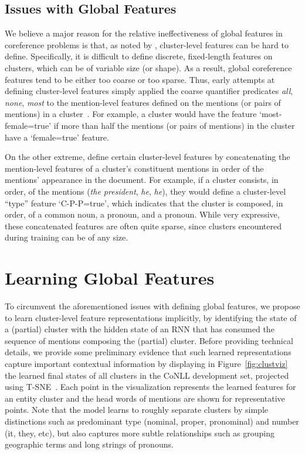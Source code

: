 \documentclass[11pt,letterpaper]{article}
\begin{document}
\subsection{Issues with Global Features}
We believe a major reason for the relative ineffectiveness of global features in coreference problems is that, as noted by , cluster-level features can be hard to define.  Specifically, it is difficult to define discrete, fixed-length features on clusters, which can be of variable size (or shape). As a result, global coreference features tend to be either too coarse or too sparse. Thus, early attempts at defining cluster-level features simply applied the coarse quantifier predicates \textit{all}, \textit{none}, \textit{most} to the mention-level features defined on the mentions (or pairs of mentions) in a cluster~\cite{culotta2007first,rahman11narrowing}. For example, a cluster would have the feature `most-female=true' if more than half the mentions (or pairs of mentions) in the cluster have a `female=true' feature. 

On the other extreme,  define certain cluster-level features by concatenating the mention-level features of a cluster's constituent mentions in order of the mentions' appearance in the document. For example, if a cluster consists, in order, of the mentions (\textit{the president}, \textit{he}, \textit{he}), they would define a cluster-level ``type'' feature `C-P-P=true', which indicates that the cluster is composed, in order, of a common noun, a pronoun, and a pronoun. While very expressive, these concatenated features are often quite sparse, since clusters encountered during training can be of any size. 
 
\section{Learning Global Features}
\label{sec:learnglobal}
To circumvent the aforementioned issues with defining global features, we propose to
learn cluster-level feature representations implicitly,
by identifying the state of a (partial) cluster with the hidden state
of an RNN that has consumed the sequence of mentions composing the
(partial) cluster. Before providing technical details,
we provide some preliminary evidence that such learned
representations capture important contextual information by displaying
in Figure~\ref{fig:clustviz} the learned final states of all clusters in the
CoNLL development set, projected using
T-SNE~\cite{maaten12visualizing}. Each point in the visualization
represents the learned features for an entity cluster and the head
words of mentions are shown for representative points. Note that the
model learns to roughly separate clusters by simple distinctions such
as predominant type (nominal, proper, pronominal) and number (it, they,
etc), but also captures more subtle relationships such as grouping
geographic terms and long strings of pronouns.
\end{document}
